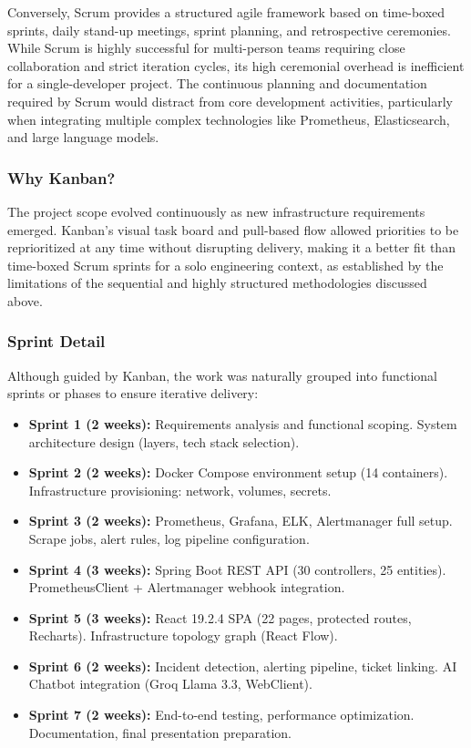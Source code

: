 \documentclass[12pt,a4paper]{report}
\begin{document}
Conversely, Scrum provides a structured agile framework based on time-boxed sprints, daily stand-up meetings, sprint planning, and retrospective ceremonies. While Scrum is highly successful for multi-person teams requiring close collaboration and strict iteration cycles, its high ceremonial overhead is inefficient for a single-developer project. The continuous planning and documentation required by Scrum would distract from core development activities, particularly when integrating multiple complex technologies like Prometheus, Elasticsearch, and large language models.

\subsubsection{Why Kanban?}
The project scope evolved continuously as new infrastructure requirements emerged. Kanban's visual task board and pull-based flow allowed priorities to be reprioritized at any time without disrupting delivery, making it a better fit than time-boxed Scrum sprints for a solo engineering context, as established by the limitations of the sequential and highly structured methodologies discussed above.

\subsubsection{Sprint Detail}
Although guided by Kanban, the work was naturally grouped into functional sprints or phases to ensure iterative delivery:
\begin{itemize}
    \item \textbf{Sprint 1 (2 weeks):} Requirements analysis and functional scoping. System architecture design (layers, tech stack selection).
    \item \textbf{Sprint 2 (2 weeks):} Docker Compose environment setup (14 containers). Infrastructure provisioning: network, volumes, secrets.
    \item \textbf{Sprint 3 (2 weeks):} Prometheus, Grafana, ELK, Alertmanager full setup. Scrape jobs, alert rules, log pipeline configuration.
    \item \textbf{Sprint 4 (3 weeks):} Spring Boot REST API (30 controllers, 25 entities). PrometheusClient + Alertmanager webhook integration.
    \item \textbf{Sprint 5 (3 weeks):} React 19.2.4 SPA (22 pages, protected routes, Recharts). Infrastructure topology graph (React Flow).
    \item \textbf{Sprint 6 (2 weeks):} Incident detection, alerting pipeline, ticket linking. AI Chatbot integration (Groq Llama 3.3, WebClient).
    \item \textbf{Sprint 7 (2 weeks):} End-to-end testing, performance optimization. Documentation, final presentation preparation.
\end{itemize}
\end{document}
